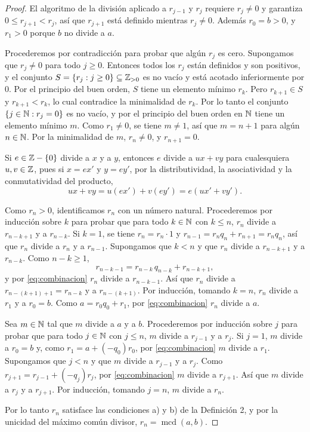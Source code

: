 \documentclass[12pt,a4paper]{article}
\begin{document}
    \begin{proof}
        El algoritmo de la división aplicado a $r_{j-1}$ y $r_j$ requiere $r_j\neq0$ y garantiza
        $0\le r_{j+1}<r_j$, así que $r_{j+1}$ está definido mientras $r_j\neq0$. Además $r_0=b>0$, y $r_1>0$ porque
        $b$ no divide a $a$.

        Procederemos por contradicción para probar que algún $r_j$ es cero. Supongamos que $r_j\neq0$ para todo
        $j\ge0$. Entonces todos los $r_j$ están definidos y son positivos, y el conjunto
        $S=\{r_j : j\ge0\}\subseteq\mathbb{Z}_{>0}$ es no vacío y está acotado inferiormente por $0$. Por el principio del
        buen orden, $S$ tiene un elemento mínimo $r_k$. Pero $r_{k+1}\in S$ y $r_{k+1}<r_k$, lo cual contradice la
        minimalidad de $r_k$. Por lo tanto el conjunto $\{j\in\mathbb{N} : r_j=0\}$ es no vacío, y por el principio del buen
        orden en $\mathbb{N}$ tiene un elemento mínimo $m$. Como $r_1\neq0$, se tiene $m\neq1$, así que $m=n+1$ para algún
        $n\in\mathbb{N}$. Por la minimalidad de $m$, $r_n\neq0$, y $r_{n+1}=0$.

        Si $e\in\mathbb{Z}-\{0\}$ divide a $x$ y a $y$, entonces $e$ divide a $ux+vy$ para cualesquiera $u,v\in\mathbb{Z}$, pues si
        $x=ex'$ y $y=ey'$, por la distributividad, la asociatividad y la conmutatividad del producto,
        \begin{equation}\label{eq:combinacion}
            ux+vy=u(ex')+v(ey')=e(ux'+vy').
        \end{equation}

        Como $r_n>0$, identificamos $r_n$ con un número natural. Procederemos por inducción sobre $k$ para probar que
        para todo $k\in\mathbb{N}$ con $k\le n$, $r_n$ divide a $r_{n-k+1}$ y a $r_{n-k}$. Si $k=1$, se tiene $r_n=r_n\cdot1$ y
        $r_{n-1}=r_nq_n+r_{n+1}=r_nq_n$, así que $r_n$ divide a $r_n$ y a $r_{n-1}$. Supongamos que $k<n$ y que $r_n$
        divide a $r_{n-k+1}$ y a $r_{n-k}$. Como $n-k\ge1$,
        \begin{equation*}
            r_{n-k-1}=r_{n-k}\,q_{n-k}+r_{n-k+1},
        \end{equation*}
        y por \eqref{eq:combinacion} $r_n$ divide a $r_{n-k-1}$. Así que $r_n$ divide a $r_{n-(k+1)+1}=r_{n-k}$ y a
        $r_{n-(k+1)}$. Por inducción, tomando $k=n$, $r_n$ divide a $r_1$ y a $r_0=b$. Como $a=r_0q_0+r_1$, por
        \eqref{eq:combinacion} $r_n$ divide a $a$.

        Sea $m\in\mathbb{N}$ tal que $m$ divide a $a$ y a $b$. Procederemos por inducción sobre $j$ para probar que para todo
        $j\in\mathbb{N}$ con $j\le n$, $m$ divide a $r_{j-1}$ y a $r_j$. Si $j=1$, $m$ divide a $r_0=b$ y, como
        $r_1=a+(-q_0)r_0$, por \eqref{eq:combinacion} $m$ divide a $r_1$. Supongamos que $j<n$ y que $m$ divide a
        $r_{j-1}$ y a $r_j$. Como $r_{j+1}=r_{j-1}+(-q_j)r_j$, por \eqref{eq:combinacion} $m$ divide a $r_{j+1}$. Así
        que $m$ divide a $r_j$ y a $r_{j+1}$. Por inducción, tomando $j=n$, $m$ divide a $r_n$.

        Por lo tanto $r_n$ satisface las condiciones a) y b) de la Definición 2, y por la unicidad del máximo común
        divisor, $r_n=\operatorname{mcd}(a,b)$.
    \end{proof}
\end{document}
